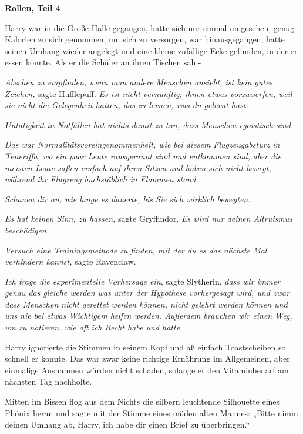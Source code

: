 

\hypertarget{rollen-teil-4}{%

\textbf{\uline{Rollen, Teil 4}}

Harry war in die Große Halle gegangen, hatte sich nur einmal umgesehen, genug Kalorien zu sich genommen, um sich zu versorgen, war hinausgegangen, hatte seinen Umhang wieder angelegt und eine kleine zufällige Ecke gefunden, in der er essen konnte. Als er die Schüler an ihren Tischen sah -

\emph{Abscheu zu empfinden, wenn man andere Menschen ansieht, ist kein gutes Zeichen,} sagte Hufflepuff. \emph{Es ist nicht vernünftig, ihnen etwas vorzuwerfen, weil sie nicht die Gelegenheit hatten, das zu lernen, was du gelernt hast.}

\emph{Untätigkeit in Notfällen hat nichts damit zu tun, dass Menschen egoistisch sind.}

\emph{Das war Normalitätsvoreingenommenheit, wie bei diesem Flugzeugabsturz in Teneriffa, wo ein paar Leute rausgerannt sind und entkommen sind, aber die meisten Leute saßen einfach auf ihren Sitzen und haben sich nicht bewegt, während ihr Flugzeug buchstäblich in Flammen stand.}

\emph{Schauen dir an, wie lange es dauerte, bis Sie sich wirklich bewegten.}

\emph{Es hat keinen Sinn, zu hassen,} sagte Gryffindor. \emph{Es wird nur deinen Altruismus beschädigen.}

\emph{Versuch eine Trainingsmethode zu finden, mit der du es das nächste Mal verhindern kannst,} sagte Ravenclaw.

\emph{Ich trage die experimentelle Vorhersage ein}, sagte Slytherin, \emph{dass wir immer genau das gleiche werden was unter der Hypothese vorhergesagt wird, und zwar dass Menschen nicht gerettet werden können, nicht gelehrt werden können und uns nie bei etwas Wichtigem helfen werden. Außerdem brauchen wir einen Weg, um zu notieren, wie oft ich Recht habe und hatte.}

Harry ignorierte die Stimmen in seinem Kopf und aß einfach Toastscheiben so schnell er konnte. Das war zwar keine richtige Ernährung im Allgemeinen, aber einmalige Ausnahmen würden nicht schaden, solange er den Vitaminbedarf am nächsten Tag nachholte.

Mitten im Bissen flog aus dem Nichts die silbern leuchtende Silhouette eines Phönix heran und sagte mit der Stimme eines müden alten Mannes: „Bitte nimm deinen Umhang ab, Harry, ich habe dir einen Brief zu überbringen.“

}

